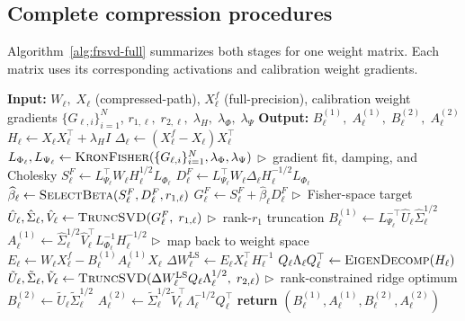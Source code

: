 \subsection{Complete compression procedures}
Algorithm~\ref{alg:frsvd-full} summarizes both stages for one weight matrix. Each matrix uses its corresponding activations and calibration weight gradients.

\begin{algorithm*}[t]
\caption{FR-SVD compression for weight matrix $W_\ell$}
\label{alg:frsvd-full}
\small
\begin{algorithmic}[1]
\State \textbf{Input:}\; $W_\ell,\; X_\ell$ (compressed-path), $X_\ell^f$ (full-precision),
\Statex \hspace{3.2em} calibration weight gradients $\{G_{\ell,i}\}_{i=1}^N$,
\Statex \hspace{3.2em} $r_{1,\ell},\; r_{2,\ell},\; \lambda_H,\; \lambda_\Phi,\; \lambda_\Psi$
\State \textbf{Output:}\; $B_\ell^{(1)},\; A_\ell^{(1)},\; B_\ell^{(2)},\; A_\ell^{(2)}$
        \State $H_\ell \gets X_\ell X_\ell^\top + \lambda_H I$
        \State $\Delta_\ell \gets (X_\ell^f - X_\ell)X_\ell^\top$ 
        \State $L_{\Phi_\ell}, L_{\Psi_\ell} \gets \Call{KronFisher}{\{G_{\ell,i}\}_{i=1}^N,\lambda_\Phi,\lambda_\Psi}$
        \Statex \hfill $\triangleright$~gradient fit, damping, and Cholesky
        \State $S_\ell^F \gets L_{\Psi_\ell}^\top W_\ell H_\ell^{1/2}L_{\Phi_\ell}$
        \State $D_\ell^F \gets L_{\Psi_\ell}^\top W_\ell\Delta_\ell H_\ell^{-1/2}L_{\Phi_\ell}$
        \State $\widehat\beta_\ell \gets \Call{SelectBeta}{S_\ell^F,D_\ell^F,r_{1,\ell}}$ 
        \State $G_\ell^F \gets S_\ell^F+\widehat\beta_\ell D_\ell^F$
        \Statex \hfill $\triangleright$~Fisher-space target
        \State $\hat{U}_\ell, \hat{\Sigma}_\ell, \hat{V}_\ell \gets \Call{TruncSVD}{G_\ell^F,\; r_{1,\ell}}$
        \Statex \hfill $\triangleright$~rank-$r_1$ truncation
        \State $B_\ell^{(1)} \gets L_{\Psi_\ell}^{-\top} \hat{U}_\ell \hat{\Sigma}_\ell^{1/2}$
        \State $A_\ell^{(1)} \gets \hat{\Sigma}_\ell^{1/2} \hat{V}_\ell^\top L_{\Phi_\ell}^{-1} H_\ell^{-1/2}$
        \Statex \hfill $\triangleright$~map back to weight space
    \EndStage
        \State $E_\ell \gets W_\ell X_\ell^f - B_\ell^{(1)} A_\ell^{(1)} X_\ell$ 
        \State $\Delta W_\ell^{\mathrm{LS}} \gets E_\ell X_\ell^\top H_\ell^{-1}$
        \State $Q_\ell \Lambda_\ell Q_\ell^\top \gets \Call{EigenDecomp}{H_\ell}$
        \State $\tilde{U}_\ell, \tilde{\Sigma}_\ell, \tilde{V}_\ell \gets \Call{TruncSVD}{\Delta W_\ell^{\mathrm{LS}} Q_\ell \Lambda_\ell^{1/2},\; r_{2,\ell}}$
        \Statex \hfill $\triangleright$~rank-constrained ridge optimum
        \State $B_\ell^{(2)} \gets \tilde{U}_\ell \tilde{\Sigma}_\ell^{1/2}$
        \State $A_\ell^{(2)} \gets \tilde{\Sigma}_\ell^{1/2} \tilde{V}_\ell^\top \Lambda_\ell^{-1/2} Q_\ell^\top$
    \EndStage
\State \textbf{return} $(B_\ell^{(1)}, A_\ell^{(1)}, B_\ell^{(2)}, A_\ell^{(2)})$
\end{algorithmic}
\end{algorithm*}


